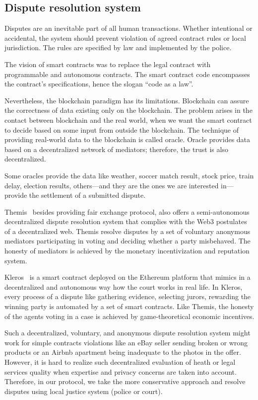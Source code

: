 \documentclass{ieeeaccess}
\begin{document}
\subsection{Dispute resolution system}

Disputes are an inevitable part of all human transactions. Whether intentional or accidental, the system should prevent violation of agreed contract rules or local jurisdiction. The rules are specified by law and implemented by the police.

The vision of smart contracts was to replace the legal contract with
programmable and autonomous contracts. The smart contract code encompasses the contract's specifications, hence the slogan ``code as a law''. 

Nevertheless, the blockchain paradigm has its limitations. Blockchain can assure the correctness of data existing only on the blockchain. The problem arises in the contact between blockchain and the real world, when we want the smart contract to decide based on some input from outside the blockchain. The technique of providing real-world data to the blockchain is called oracle. Oracle provides data based on a decentralized network of mediators; therefore, the trust is also decentralized.

Some oracles provide the data like weather, soccer match result, stock
price, train delay, election results, others—and they are the ones we
are interested in—provide the settlement of a submitted dispute.

Themis~\cite{mengThemisDecentralizedEscrow2019} besides providing fair exchange protocol,
also offers a semi-autonomous decentralized dispute resolution system that complies with the Web3 postulates of a decentralized web. Themis
resolve disputes by a set of voluntary anonymous mediators participating
in voting and deciding whether a party misbehaved. The honesty of
mediators is achieved by the monetary incentivization and reputation
system.

Kleros~\cite{bergollaKlerosSociolegalCase2022} is a smart contract deployed on the Ethereum platform that mimics in a decentralized and autonomous way how the court works in real life. In Kleros, every process of a dispute like gathering evidence, selecting jurors, rewarding the winning party is automated by a set of smart contracts. Like Themis, the honesty of the agents voting in a case is achieved by game-theoretical economic incentives.

Such a decentralized, voluntary, and anonymous dispute resolution system might work for simple contracts violations like an eBay seller sending broken or wrong products or an Airbnb apartment being inadequate to the photos in the offer. However, it is hard to realize such decentralized evaluation of heath or legal services quality when expertise and privacy concerns are taken into account. Therefore, in our protocol, we take the more conservative approach and resolve disputes using local
justice system (police or court).
\end{document}
